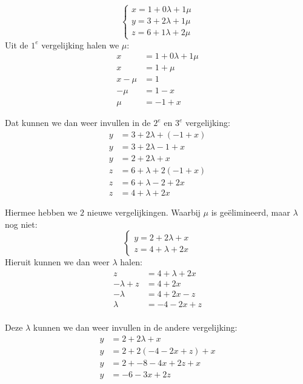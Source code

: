 \[\begin{cases}
x =  1 + 0\lambda + 1\mu\\
y =  3 + 2\lambda  + 1\mu\\
z = 6 + 1 \lambda + 2\mu  
\end{cases}
\] 
Uit de $ 1^{e}$ vergelijking halen we $ \mu $:
\begin{align*}
  x &= 1 + 0\lambda + 1\mu \\
  x &= 1 + \mu \\
  x - \mu &= 1 \\
  -\mu &= 1 - x \\
  \mu &= -1 + x
\end{align*}

Dat kunnen we dan weer invullen in de $ 2^{e}$ en $ 3^{e}$ vergelijking:
\begin{align*}
  y &= 3 + 2\lambda  + (-1 + x) \\
  y &= 3 + 2\lambda -1 + x \\
  y &= 2 + 2\lambda + x
\end{align*}
\begin{align*}
  z &= 6 + \lambda + 2(-1 + x) \\
  z &= 6 + \lambda -2 + 2x \\
  z &= 4 + \lambda + 2x
\end{align*}

Hiermee hebben we $2$ nieuwe vergelijkingen. Waarbij $\mu$ is ge\"elimineerd, maar $\lambda$ nog niet:
\[\begin{cases}
  y = 2 + 2\lambda + x \\
  z = 4 + \lambda + 2x
\end{cases}
\] 
Hieruit kunnen we dan weer $\lambda$ halen: 
\begin{align*}
  z &= 4 + \lambda + 2x \\
  -\lambda + z &= 4 + 2x \\
  -\lambda &= 4 + 2x - z \\
  \lambda &= -4 - 2x + z \\
\end{align*}

Deze $\lambda$ kunnen we dan weer invullen in de andere vergelijking:
\begin{align*}
  y &= 2 + 2\lambda + x \\
  y &= 2 + 2(-4 -2x + z) + x \\
  y &= 2 + -8 -4x + 2z + x \\
  y &= -6 -3x + 2z \\
\end{align*}

